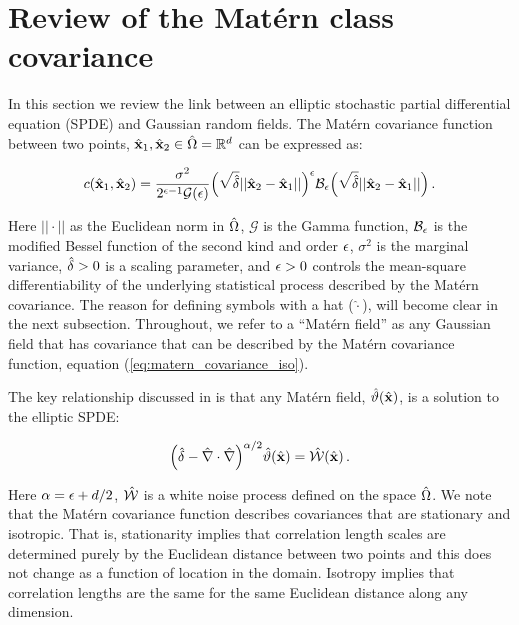 \section{Review of the Mat\'ern class covariance}
\label{sec:matern_review}

In this section we review the link between an elliptic stochastic partial
differential equation (SPDE) and Gaussian random fields.
The Mat\'ern covariance function between two points, $\hat{\mathbf{x}}_1,\hat{\mathbf{x}}_2\in\hat{\Omega} =
\mathbb{R}^{d}$ can be expressed as:
\begin{linenomath}\begin{equation}
    c(\hat{\mathbf{x}}_1,\hat{\mathbf{x}}_2) = \dfrac{\sigma^2}{2^{\epsilon-1}
    \mathcal{G}(\epsilon)}
    \Big(\sqrt{\hat{\delta}} ||\hat{\mathbf{x}}_2-\hat{\mathbf{x}}_1||\Big)^{\epsilon}
    \mathcal{B}_{\epsilon}
    \Big(\sqrt{\hat{\delta}} ||\hat{\mathbf{x}}_2-\hat{\mathbf{x}}_1||\Big) \, .
    \label{eq:matern_covariance_iso}
\end{equation}\end{linenomath}
Here $||\cdot||$ as the Euclidean norm in $\hat{\Omega}$,
$\mathcal{G}$ is the Gamma function,
$\mathcal{B}_{\epsilon}$ is the modified
Bessel function of the second kind and order $\epsilon$,
$\sigma^2$ is the
marginal variance, $\hat{\delta}>0$ is a scaling parameter, and $\epsilon>0$
controls the mean-square differentiability of the underlying statistical process
described by the Mat\'ern covariance.
The reason for defining symbols with a hat ($\hat{\cdot}$), will become clear
in the next subsection.
Throughout, we refer to a ``Mat\'ern field'' as any Gaussian field that has
covariance that can be described by the Mat\'ern covariance function,
equation (\ref{eq:matern_covariance_iso}).

The key relationship discussed in \citet{RSSB:RSSB777} is that any Mat\'ern field,
$\hat{\vartheta}(\hat{\mathbf{x}})$, is a solution to the elliptic SPDE:
\begin{linenomath}\begin{equation}
    \Big(\hat{\delta} - \hat{\nabla}\cdot\hat{\nabla}\Big)^{\alpha/2}\hat{\vartheta}(\hat{\mathbf{x}}) =
    \hat{\mathcal{W}}(\hat{\mathbf{x}}) \, .
    \label{eq:spde_iso}
\end{equation}\end{linenomath}
Here $\alpha = \epsilon + d/2$,
$\hat{\mathcal{W}}$ is a white noise process defined on the space $\hat{\Omega}$.
We note that the Mat\'ern covariance function describes covariances that are
stationary and isotropic.
That is, stationarity implies that correlation length scales are determined
purely by the Euclidean distance between two points and this does not change as
a function of location in the domain.
Isotropy implies that correlation lengths are the same for the same Euclidean
distance along any dimension.

